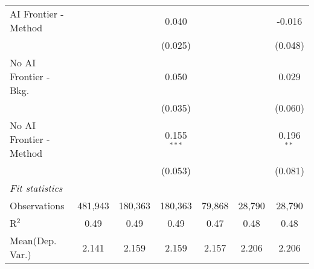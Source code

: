 \begin{tabular}{lcccccc}
   AI Frontier - Method    &               &               & 0.040         &               &               & -0.016\\   
                           &               &               & (0.025)       &               &               & (0.048)\\   
   No AI Frontier - Bkg.   &               &               & 0.050         &               &               & 0.029\\   
                           &               &               & (0.035)       &               &               & (0.060)\\   
   No AI Frontier - Method &               &               & 0.155$^{***}$ &               &               & 0.196$^{**}$\\   
                           &               &               & (0.053)       &               &               & (0.081)\\   
   \midrule
   \emph{Fit statistics}\\
   Observations            & 481,943       & 180,363       & 180,363       & 79,868        & 28,790        & 28,790\\  
   R$^2$                   & 0.49          & 0.49          & 0.49          & 0.47          & 0.48          & 0.48\\  
Mean(Dep. Var.) & 2.141 & 2.159 & 2.159 & 2.157 & 2.206 & 2.206 \\
   

\end{tabular}
